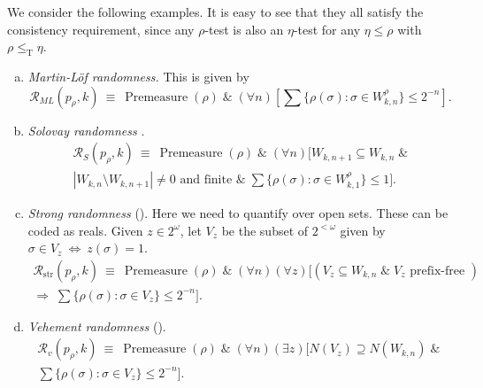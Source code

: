 \documentclass[11pt,reqno]{article}
\theoremstyle{plain}
\theoremstyle{definition}
\theoremstyle{remark}
\numberwithin{equation}{section}
\newcommand{\Cant}{\ensuremath{2^{\omega}}}
\newcommand{\Str}[1][<\omega]{\ensuremath{2^{#1}}}
\newcommand{\Acyl}[1]{\ensuremath{N(#1)}}
\DeclareMathOperator{\T}{T}
\begin{document}
We consider the following examples. It is easy to see that they all satisfy the consistency requirement, since any $\rho$-test is also an $\eta$-test for any $\eta \leq \rho$ with $\rho \leq_{\T} \eta$.

\begin{enumerate}[(a)]
	\item \emph{Martin-L\"of randomness.} This is given by 
	\[
		\mathcal{R}_{ML}(p_\rho,k) \: \equiv \: \operatorname{Premeasure}(\rho) \; \& \; (\forall n) \left[ \sum \{\rho(\sigma) \colon \sigma \in W^{\rho}_{k,n} \} \leq 2^{-n} \right].
	\]
	
	\item \emph{Solovay randomness} \citep{solovay:1975}. 
	\begin{multline*}
		\mathcal{R}_{S}(p_\rho,k) \: \equiv \: \operatorname{Premeasure}(\rho) \; \& \; (\forall n) \biggl[ W_{k,n+1} \subseteq W_{k,n} \; \& \\
		 |W_{k,n} \setminus W_{k,n+1}| \neq 0 \text{ and finite } \& \;  \sum \{\rho(\sigma) \colon \sigma \in W^{\rho}_{k,1} \} \leq 1 \biggr].	
	\end{multline*}
	
	\item \emph{Strong randomness} (\citet{calude-staiger-terwijn:2006}). Here we need to quantify over open sets. These can be coded as reals. Given $z \in \Cant$, let $V_z$ be the subset of $\Str$ given by $\sigma \in V_z \: \Leftrightarrow \: z(\sigma) = 1$.
	\begin{multline*}
	\mathcal{R}_{\operatorname{str}}(p_\rho,k) \: \equiv \: \operatorname{Premeasure}(\rho) \; \& \; (\forall n) (\forall z) \biggl[ (V_z  \subseteq W_{k,n} \; \& \; V_z \text{ prefix-free } ) \\
	 \Rightarrow \;  \sum \{\rho(\sigma) \colon \sigma \in V_z \} \leq 2^{-n} \biggr].				
	\end{multline*}
	
	\item \emph{Vehement randomness} (\citet{kjoshanssen:ip}). 
	\begin{multline*}
		\mathcal{R}_{v}(p_\rho,k) \: \equiv \: \operatorname{Premeasure}(\rho) \; \& \; (\forall n) (\exists z) \biggl[ \Acyl{V_z} \supseteq  \Acyl{W_{k,n}} \; \& \; \\
		 \sum \{\rho(\sigma) \colon \sigma \in V_z \} \leq 2^{-n} \biggr].				
	\end{multline*}
	
\end{enumerate}
\end{document}
